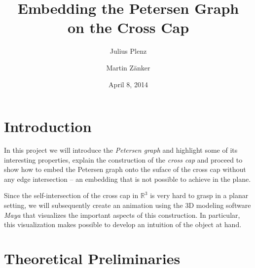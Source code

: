 \documentclass[11pt,            %
               a4paper,         %
               oneside,         %
               DIV12,           %
               fleqn,           %
               halfparskip,     %
               nochapterprefix, %
              ]{scrartcl} %
\theoremstyle{definition}
\begin{document}
\thispagestyle{empty}               %

\title{Embedding the Petersen Graph\\ on the Cross Cap}
\author{Julius Plenz \and Martin Zänker}
\date{April 8, 2014}

\maketitle





\section*{Introduction}

In this project we will introduce the \emph{Petersen graph} and highlight
some of its interesting properties, explain the construction of the
\emph{cross cap} and proceed to show how to embed the Petersen graph
onto the suface of the cross cap without any edge intersection --
an embedding that is not possible to achieve in the plane.

Since the self-intersection of the cross cap in $\mathbb{R}^3$ is very
hard to grasp in a planar setting, we will subsequently create an
animation using the 3D modeling software \emph{Maya} that visualizes
the important aspects of this construction. In particular, this
visualization makes possible to develop an intuition of the object
at hand.

\section{Theoretical Preliminaries}
\label{sec:theoretical}
\end{document}
